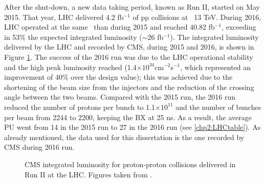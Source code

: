 \noindent After the shut-down, a new data taking period, known as Run II, started on May 
2015. That year, LHC delivered 4.2 fb$^{-1}$ of pp collisions at \sqrts~13 TeV. During 2016, LHC 
operated at the same \centermassenergy~than during 2015 and reached 40.82 fb$^{-1}$, exceeding  in 53$\%$ the expected integrated 
luminosity ($\sim$26 fb$^{-1}$). The integrated luminosity delivered by the LHC and recorded by CMS, 
during 2015 and 2016, is shown in Figure \ref{figchp2:luminosityRunII}. The success of the 2016 run was due to
the LHC operational stability and the high peak luminosity reached (1.4$\times10^{34}$cm$^{-2}$s$^{-1}$, which represented 
an improvement of 40$\%$ over the design value); this was achieved due to 
the shortening of the beam size from the injectors and the reduction of the 
crossing angle between the two beams. Compared with the 2015 run, the 2016 run 
reduced the number of protons per bunch to 1.1$\times10^{11}$ and the number of bunches per beam 
from 2244 to 2200, keeping the BX at 25 ns. As a result, the average
PU went from 14 in the 2015 run to 27 in the 2016 run (see \ref{chp2:LHCtable}). As already mentioned, 
the data used for this dissertation is the one recorded by CMS during 2016 run.
\begin{figure}[ht]
    \begin{center}
      \caption{CMS integrated luminosity for proton-proton collisions delivered
      in Run II at the LHC. Figures taken from \cite{chp2:LHCluminosity}.}
     \label{figchp2:luminosityRunII}
    \end{center}
\end{figure}

